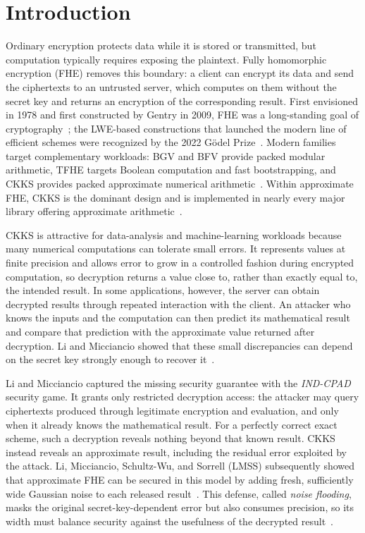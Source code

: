 \section{Introduction}
\label{sec:introduction}



Ordinary encryption protects data while it is stored or transmitted, but
computation typically requires exposing the plaintext.
Fully homomorphic encryption (FHE) removes this boundary: a client can encrypt
its data and send the ciphertexts to an untrusted server, which computes on them
without the secret key and returns an encryption of the corresponding result.
First envisioned in 1978 and first constructed by Gentry in 2009, FHE was a
long-standing goal of cryptography~\cite{rad78,gentry09}; the LWE-based
constructions that launched the modern line of efficient schemes were
recognized by the 2022 G{\"o}del Prize~\cite{godel2022}.
Modern families target complementary workloads: BGV and BFV provide packed
modular arithmetic, TFHE targets Boolean computation and fast bootstrapping, and
CKKS provides packed approximate numerical
arithmetic~\cite{godel2022,fv12,tfhe,ckks}.
Within approximate FHE, CKKS is the dominant design and is implemented in
nearly every major library offering approximate arithmetic~\cite{heprofiler}.

CKKS is attractive for data-analysis and machine-learning workloads because
many numerical computations can tolerate small errors.
It represents values at finite precision and allows error to grow in a
controlled fashion during encrypted computation, so decryption returns a value
close to, rather than exactly equal to, the intended result.
In some applications, however, the server can obtain decrypted results through
repeated interaction with the client.
An attacker who knows the inputs and the computation can then predict its
mathematical result and compare that prediction with the approximate value
returned after decryption.
Li and Micciancio showed that these small discrepancies can depend on the secret
key strongly enough to recover it~\cite{lm}.

Li and Micciancio captured the missing security guarantee with the
\emph{IND-CPAD} security game.
It grants only restricted decryption access: the attacker may query ciphertexts
produced through legitimate encryption and evaluation, and only when it already
knows the mathematical result.
For a perfectly correct exact scheme, such a decryption reveals nothing beyond
that known result.
CKKS instead reveals an approximate result, including the residual error
exploited by the attack.
Li, Micciancio, Schultz-Wu, and Sorrell (LMSS) subsequently showed that
approximate FHE can be secured in this model by adding fresh, sufficiently wide
Gaussian noise to each released result~\cite{lmss}.
This defense, called \emph{noise flooding}, masks the original
secret-key-dependent error but also consumes precision, so its width must balance
security against the usefulness of the decrypted
result~\cite{costache2023precision,bergamaschi2025revisiting}.

